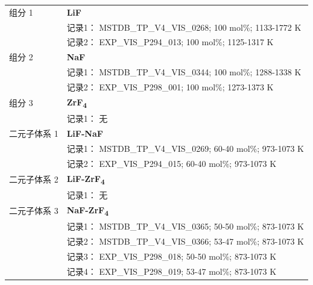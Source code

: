 \documentclass[12pt]{article}
\begin{document}
{\begin{longtable}[]{@{}
  >{\raggedright\arraybackslash}p{}
  >{\raggedright\arraybackslash}p{}@{}}
组分 1  & \textbf{LiF} \\
 & 记录1： MSTDB\_TP\_V4\_VIS\_0268; 100 mol\%; 1133-1772 K \\
 & 记录2： EXP\_VIS\_P294\_013; 100 mol\%; 1125-1317 K  \\

组分 2  & \textbf{NaF} \\
 & 记录1： MSTDB\_TP\_V4\_VIS\_0344; 100 mol\%; 1288-1338 K \\
 & 记录2： EXP\_VIS\_P298\_001; 100 mol\%; 1273-1373 K  \\

组分 3 & \textbf{ZrF\textsubscript{4}} \\
 & 记录1： 无 \\
二元子体系 1  & \textbf{LiF-NaF} \\
 & 记录1： MSTDB\_TP\_V4\_VIS\_0269; 60-40 mol\%; 973-1073 K \\
 & 记录2： EXP\_VIS\_P294\_015; 60-40 mol\%; 973-1073 K  \\

二元子体系 2 & \textbf{LiF-ZrF\textsubscript{4}} \\
 & 记录1： 无 \\
二元子体系 3  & \textbf{NaF-ZrF\textsubscript{4}} \\
 & 记录1： MSTDB\_TP\_V4\_VIS\_0365; 50-50 mol\%; 873-1073 K \\
 & 记录2： MSTDB\_TP\_V4\_VIS\_0366; 53-47 mol\%; 873-1073 K \\
 & 记录3： EXP\_VIS\_P298\_018; 50-50 mol\%; 873-1073 K \\
 & 记录4： EXP\_VIS\_P298\_019; 53-47 mol\%; 873-1073 K  \\


\end{longtable}}
\end{document}
